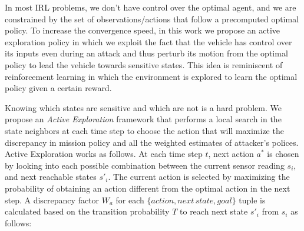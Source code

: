 \documentclass[letterpaper, 10 pt, conference]{ieeeconf}  %
\begin{document}

In most IRL problems, we don't have control over the optimal agent, and we are constrained by the set of observations/actions that follow a precomputed optimal policy. To increase the convergence speed, in this work we propose an active exploration policy in which we exploit the fact that the vehicle has control over its inputs even during an attack and thus perturb its motion from the optimal policy to lead the vehicle towards sensitive states. This idea is reminiscent of reinforcement learning in which the environment is explored to learn the optimal policy given a certain reward.

Knowing which states are sensitive and which are not is a hard problem. We propose an \textit{Active Exploration} framework that performs a local search in the state neighbors at each time step to choose the action that will maximize the discrepancy in mission policy and all the weighted estimates of attacker's polices.
Active Exploration works as follows. At each time step $t$, next action $a^*$ is chosen by looking into each possible combination between the current sensor reading $s_i$, and next reachable states $s'_i$. The current action is selected by maximizing the probability of obtaining an action different from the optimal action in the next step. A discrepancy factor $W_a$ for each $\{action, next\,state, goal\}$ tuple is calculated based on the transition probability $T$ to reach next state $s'_i$ from $s_i$ as follows:
\end{document}
